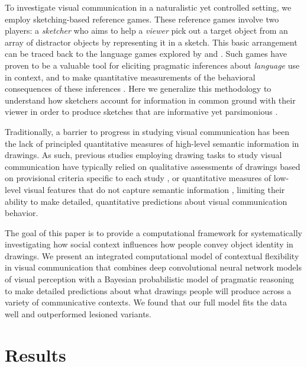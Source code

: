\documentclass[9pt,twocolumn,twoside]{pnas-new}
\begin{document}
To investigate visual communication in a naturalistic yet controlled setting, we employ sketching-based reference games. 
These reference games involve two players: a \textit{sketcher} who aims to help a \textit{viewer} pick out a target object from an array of distractor objects by representing it in a sketch. 
This basic arrangement can be traced back to the language games explored by \citep{wittgenstein1953philosophical} and \citep{Lewis69_Convention}. 
Such games have proven to be a valuable tool for eliciting pragmatic inferences about \textit{language} use in context, and to make quantitative measurements of the behavioral consequences of these inferences \cite{goodman2016pragmatic,kao2014formalizing,goodman2013knowledge,frank2012predicting}. 
Here we generalize this methodology to understand how sketchers account for information in common ground with their viewer in order to produce sketches that are informative \cite{grice1975syntax,wilson1986relevance} yet parsimonious \cite{zipf1936psycho}.

Traditionally, a barrier to progress in studying visual communication has been the lack of principled quantitative measures of high-level semantic information in drawings. 
As such, previous studies employing drawing tasks to study visual communication have typically relied on qualitative assessments of drawings based on provisional criteria specific to each study \cite{Healey:2007vq}, or quantitative measures of low-level visual features that do not capture semantic information \cite{Garrod:2007wk}, limiting their ability to make detailed, quantitative predictions about visual communication behavior.

The goal of this paper is to provide a computational framework for systematically investigating how social context influences how people convey object identity in drawings. 
We present an integrated computational model of contextual flexibility in visual communication that combines deep convolutional neural network models of visual perception \cite{simonyan2014very,FanCommon2018} with a Bayesian probabilistic model of pragmatic reasoning \cite{goodman2016pragmatic} to make detailed predictions about what drawings people will produce across a variety of communicative contexts. 
We found that our full model fits the data well and outperformed lesioned variants.

\section*{Results}
\end{document}
